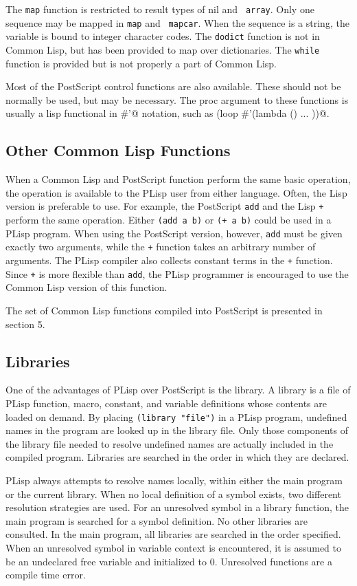 The {\tt map} function is restricted to result types of nil and {\tt
array}.  Only one sequence may be mapped in {\tt map} and {\tt
mapcar}.  When the sequence is a string, the variable is bound to
integer character codes.
The {\tt dodict} function is not in Common Lisp, but has been
provided to map over dictionaries.  The {\tt while} function is
provided but is not properly a part of Common Lisp.

Most of the PostScript control functions are also available.  These
should not be normally be used, but may be necessary.  The proc
argument to these functions is usually a lisp functional in \verb@#'@
notation, such as \verb@(loop #'(lambda () ... ))@.

\subsection{Other Common Lisp Functions}
When a Common Lisp and PostScript function perform the same basic operation,
the operation is available to the PLisp user from either language.  Often,
the Lisp version is preferable to use.  For example,
the PostScript {\tt add} and the Lisp {\tt +} perform the same operation.
Either {\tt (add a b)} or {\tt (+ a b)} could be used in a PLisp
program.  When using the 
PostScript version, however, {\tt add} must be given exactly two
arguments, while 
the {\tt +} function takes an arbitrary number of arguments.  The
PLisp compiler 
also collects constant terms in the {\tt +} function.  Since {\tt +}
is more flexible than 
{\tt add}, the PLisp programmer is encouraged to use the Common Lisp
version of this function.

The set of Common Lisp functions compiled into PostScript is
presented in section 5.

\subsection{Libraries}
One of the advantages of PLisp over PostScript is the library.  A
library is a file of 
PLisp function, macro, constant, and variable definitions whose
contents are loaded on demand.  By placing {\tt (library "file")} in a PLisp
program, undefined names in the program are looked up in the library
file.  Only those components of the library file needed to resolve
undefined names are actually included in the compiled program.
Libraries are searched in the order in which they are declared.

PLisp always attempts to resolve names locally, within either the
main program or the current library.  When no local definition of a symbol
exists, two different resolution strategies are used.  For an unresolved
symbol in a library
function, the main program is searched for a symbol definition.  No other
libraries are consulted.  In the main program, all libraries are searched
in the order specified.  When an unresolved symbol in variable context
is encountered, it is assumed to be an undeclared free variable and
initialized to 0.  Unresolved functions are a compile time error.

